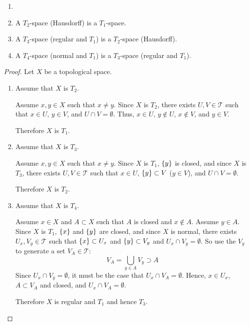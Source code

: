 \documentclass[letterpaper,12pt,fleqn]{article}
\newcommand{\T}{\mathscr{T}}
\begin{document}
\begin{theorem}[4.7]
  \begin{enumerate}
  \item[]
  \item A \(T_2\)-space (Hausdorff) is a \(T_1\)-space.
  \item A \(T_3\)-space (regular and \(T_1\)) is a \(T_2\)-space (Hausdorff).
  \item A \(T_4\)-space (normal and \(T_1\)) is a \(T_3\)-space (regular and \(T_1\)).
  \end{enumerate}
\end{theorem}

\begin{proof}
  Let \(X\) be a topological space.
  \begin{enumerate}
  \item Assume that \(X\) is \(T_2\).

    Assume \(x,y\in X\) such that \(x\ne y\).  Since \(X\) is \(T_2\), there exists \(U,V\in\T\) such that
    \(x\in U\), \(y\in V\), and \(U\cap V=\emptyset\).  Thus, \(x\in U\), \(y\notin U\), \(x\notin V\), and
    \(y\in V\).

    Therefore \(X\) is \(T_1\).

  \item Assume that \(X\) is \(T_3\).

    Assume \(x,y\in X\) such that \(x\ne y\).  Since \(X\) is \(T_1\), \(\{y\}\) is closed, and since \(X\) is
    \(T_3\), there exists \(U,V\in\T\) such that \(x\in U\), \(\{y\}\subset V\) (\(y\in V\)), and
    \(U\cap V=\emptyset\).

    Therefore \(X\) is \(T_2\).

  \item Assume that \(X\) is \(T_4\).

    Assume \(x\in X\) and \(A\subset X\) such that \(A\) is closed and \(x\notin A\).  Assume \(y\in A\).  Since
    \(X\) is \(T_1\), \(\{x\}\) and \(\{y\}\) are closed, and since \(X\) is normal, there exists
    \(U_x,V_y\in\T\) such that \(\{x\}\subset U_x\) and \(\{y\}\subset V_y\) and \(U_x\cap V_y=\emptyset\).  So
    use the \(V_y\) to generate a set \(V_A\in\T\):
    \[V_A=\bigcup_{y\in A}V_y\supset A\]
    Since \(U_x\cap V_y=\emptyset\), it must be the case that \(U_x\cap V_A=\emptyset\).  Hence, \(x\in U_x\),
    \(A\subset V_A\) and closed, and \(U_x\cap V_A=\emptyset\).

    Therefore \(X\) is regular and \(T_1\) and hence \(T_3\).
  \end{enumerate}
\end{proof}
\end{document}
